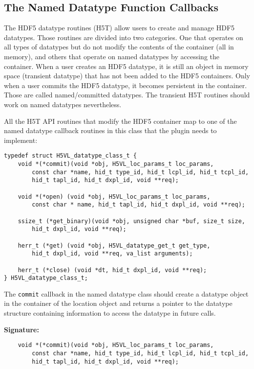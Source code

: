\subsection{The Named Datatype Function Callbacks}
The HDF5 datatype routines (H5T) allow users to create and manage HDF5
datatypes. Those routines are divided into two categories. One that
operates on all types of datatypes but do not modify the contents of
the container (all in memory), and others that operate on named
datatypes by accessing the container. When a user creates an HDF5
datatype, it is still an object in memory space (transient datatype)
that has not been added to the HDF5 containers. Only when a user
commits the HDF5 datatype, it becomes persistent in the
container. Those are called named/committed datatypes. The transient
H5T routines should work on named datatypes nevertheless. 

All the H5T API routines that modify the HDF5 container map to one of
the named datatype callback routines in this class that the plugin needs to
implement:

\begin{lstlisting}
typedef struct H5VL_datatype_class_t {
    void *(*commit)(void *obj, H5VL_loc_params_t loc_params, 
        const char *name, hid_t type_id, hid_t lcpl_id, hid_t tcpl_id, 
        hid_t tapl_id, hid_t dxpl_id, void **req);

    void *(*open) (void *obj, H5VL_loc_params_t loc_params, 
        const char * name, hid_t tapl_id, hid_t dxpl_id, void **req);

    ssize_t (*get_binary)(void *obj, unsigned char *buf, size_t size, 
        hid_t dxpl_id, void **req);

    herr_t (*get) (void *obj, H5VL_datatype_get_t get_type, 
        hid_t dxpl_id, void **req, va_list arguments);

    herr_t (*close) (void *dt, hid_t dxpl_id, void **req);
} H5VL_datatype_class_t;
\end{lstlisting}

The {\tt commit} callback in the named datatype class should create a datatype object in the container of the location object and
returns a pointer to the datatype structure containing information to
access the datatype in future calls. 

\textbf{Signature:}
\begin{lstlisting}
    void *(*commit)(void *obj, H5VL_loc_params_t loc_params, 
        const char *name, hid_t type_id, hid_t lcpl_id, hid_t tcpl_id, 
        hid_t tapl_id, hid_t dxpl_id, void **req);
\end{lstlisting}

